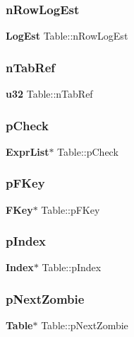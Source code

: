 \mbox{\label{struct_table_ae3835f1c227f6f14ec412d04fae854aa}} 
\subsubsection{nRowLogEst}
{\footnotesize\ttfamily \textbf{ Log\+Est} Table\+::n\+Row\+Log\+Est}

\mbox{\label{struct_table_add919ac83c180478ae8fd62e9ecfbdd3}} 
\subsubsection{nTabRef}
{\footnotesize\ttfamily \textbf{ u32} Table\+::n\+Tab\+Ref}

\mbox{\label{struct_table_a4513ad39c4adad36fdf5dd3c6cb70a12}} 
\subsubsection{pCheck}
{\footnotesize\ttfamily \textbf{ Expr\+List}$\ast$ Table\+::p\+Check}

\mbox{\label{struct_table_a37ccce5ee6d530001d49c82788c6616d}} 
\subsubsection{pFKey}
{\footnotesize\ttfamily \textbf{ F\+Key}$\ast$ Table\+::p\+F\+Key}

\mbox{\label{struct_table_a5dffd0c9e8f0265d6a47b32bd0e6d59f}} 
\subsubsection{pIndex}
{\footnotesize\ttfamily \textbf{ Index}$\ast$ Table\+::p\+Index}

\mbox{\label{struct_table_ae365eb0d8f6d3cb39f3908323cba45e4}} 
\subsubsection{pNextZombie}
{\footnotesize\ttfamily \textbf{ Table}$\ast$ Table\+::p\+Next\+Zombie}

